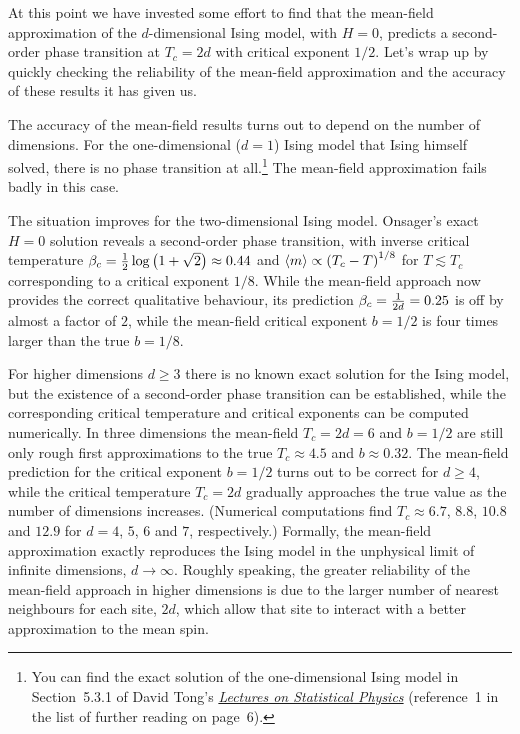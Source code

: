 At this point we have invested some effort to find that the mean-field approximation of the $d$-dimensional Ising model, with $H = 0$, predicts a second-order phase transition at $T_c = 2d$ with critical exponent $1 / 2$.
Let's wrap up by quickly checking the reliability of the mean-field approximation and the accuracy of these results it has given us.

The accuracy of the mean-field results turns out to depend on the number of dimensions.
For the one-dimensional ($d = 1$) Ising model that Ising himself solved, there is no phase transition at all.\footnote{You can find the exact solution of the one-dimensional Ising model in Section~5.3.1 of David Tong's \href{https://www.damtp.cam.ac.uk/user/tong/statphys.html}{\textit{Lectures on Statistical Physics}} (reference~1 in the list of further reading on page~6).}
The mean-field approximation fails badly in this case.

The situation improves for the two-dimensional Ising model.
Onsager's exact $H = 0$ solution reveals a second-order phase transition, with inverse critical temperature $\beta_c = \frac{1}{2} \log\left(1 + \sqrt{2}\right) \approx 0.44$ and $\left\langle m \right\rangle \propto \left(T_c - T\right)^{1 / 8}$ for $T \lesssim T_c$ corresponding to a critical exponent $1 / 8$.
While the mean-field approach now provides the correct qualitative behaviour, its prediction $\beta_c = \frac{1}{2d} = 0.25$ is off by almost a factor of $2$, while the mean-field critical exponent $b = 1 / 2$ is four times larger than the true $b = 1 / 8$.

For higher dimensions $d \geq 3$ there is no known exact solution for the Ising model, but the existence of a second-order phase transition can be established, while the corresponding critical temperature and critical exponents can be computed numerically.
In three dimensions the mean-field $T_c = 2d = 6$ and $b = 1 / 2$ are still only rough first approximations to the true $T_c \approx 4.5$ and $b \approx 0.32$. %
The mean-field prediction for the critical exponent $b = 1 / 2$ turns out to be correct for $d \geq 4$, while the critical temperature $T_c = 2d$ gradually approaches the true value as the number of dimensions increases.
(Numerical computations find $T_c \approx 6.7$, $8.8$, $10.8$ and $12.9$ for $d = 4$, $5$, $6$ and $7$, respectively.) %
Formally, the mean-field approximation exactly reproduces the Ising model in the unphysical limit of infinite dimensions, $d \to \infty$.
Roughly speaking, the greater reliability of the mean-field approach in higher dimensions is due to the larger number of nearest neighbours for each site, $2d$, which allow that site to interact with a better approximation to the mean spin.
